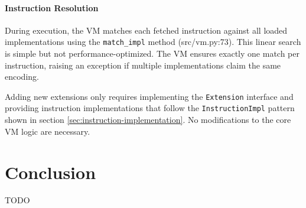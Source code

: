\documentclass[sigconf]{acmart}
\begin{document}
\paragraph{Instruction Resolution}
During execution, the VM matches each fetched instruction against all loaded implementations using the \texttt{match\_impl} method (src/vm.py:73). This linear search is simple but not performance-optimized. The VM ensures exactly one match per instruction, raising an exception if multiple implementations claim the same encoding.

Adding new extensions only requires implementing the \texttt{Extension} interface and providing instruction implementations that follow the \texttt{InstructionImpl} pattern shown in section \ref{sec:instruction-implementation}. No modifications to the core VM logic are necessary. 

\section{Conclusion}
TODO



\end{document}

